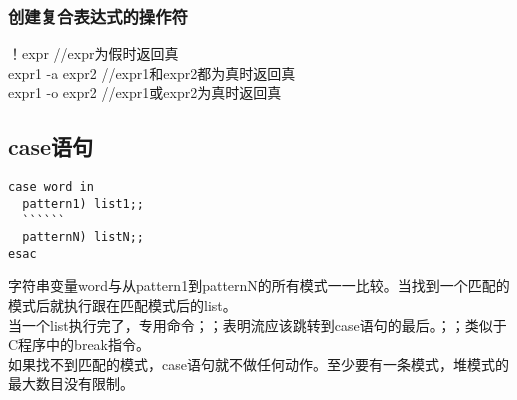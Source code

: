 \documentclass[11pt,a4paper,titlepage]{article}
\begin{document}
{\subsubsection{\kai 创建复合表达式的操作符}
！expr     //expr为假时返回真\\
expr1 -a expr2     //expr1和expr2都为真时返回真\\
expr1 -o expr2     //expr1或expr2为真时返回真\\

\subsection{\kai case语句}
\begin{lstlisting}
case word in
  pattern1) list1;;
  ``````
  patternN) listN;;
esac
\end{lstlisting}
字符串变量word与从pattern1到patternN的所有模式一一比较。当找到一个匹配的模式后就执行跟在匹配模式后的list。\\
当一个list执行完了，专用命令；；表明流应该跳转到case语句的最后。；；类似于C程序中的break指令。\\
如果找不到匹配的模式，case语句就不做任何动作。至少要有一条模式，堆模式的最大数目没有限制。\\

}
\end{document}
